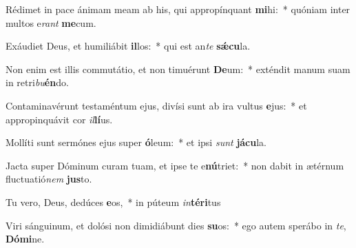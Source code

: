 \item Rédimet in pace ánimam meam ab his, qui appropínquant \textbf{mi}hi:~* quóniam inter multos e\textit{rant} \textbf{me}cum.
\item Exáudiet Deus, et humiliábit \textbf{il}los:~* qui est an\textit{te} \textbf{sǽ}\textbf{cu}la.
\item Non enim est illis commutátio, et non timuérunt \textbf{De}um:~* exténdit manum suam in retri\textit{bu}\textbf{én}do.
\item Contaminavérunt testaméntum ejus, divísi sunt ab ira vultus \textbf{e}jus:~* et appropinquávit cor \textit{il}\textbf{lí}us.
\item Mollíti sunt sermónes ejus super \textbf{ó}leum:~* et ipsi \textit{sunt} \textbf{já}\textbf{cu}la.
\item Jacta super Dóminum curam tuam, et ipse te e\textbf{nú}triet:~* non dabit in ætérnum fluctuatió\textit{nem} \textbf{jus}to.
\item Tu vero, Deus, dedúces \textbf{e}os,~* in púteum \textit{in}\textbf{tér}\textbf{i}tus
\item Viri sánguinum, et dolósi non dimidiábunt dies \textbf{su}os:~* ego autem sperábo in \textit{te}, \textbf{Dó}\textbf{mi}ne.
